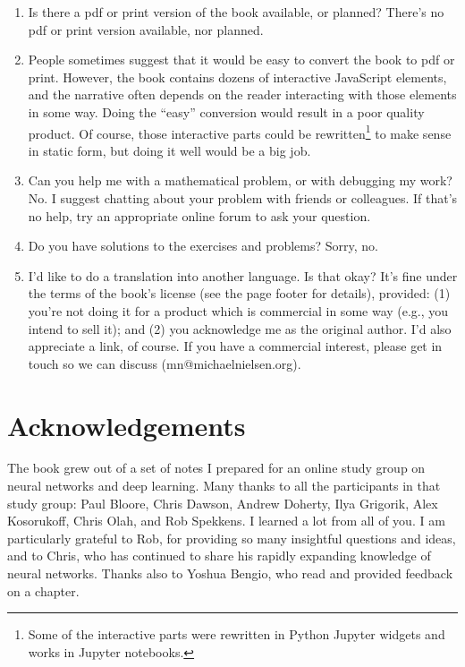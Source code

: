\begin{enumerate}

\item
Is there a pdf or print version of the book available, or planned? There's no pdf or print version available, nor planned.

\item
People sometimes suggest that it would be easy to convert the book to pdf or print. However, the book contains dozens of interactive JavaScript elements, and the narrative often depends on the reader interacting with those elements in some way. Doing the ``easy'' conversion would result in a poor quality product. Of course, those interactive parts could be rewritten\footnote{Some of the interactive parts were rewritten in Python Jupyter widgets and works in Jupyter notebooks\cite{willersNNDLgithub2019}.} to make sense in static form, but doing it well would be a big job.

\item
Can you help me with a mathematical problem, or with debugging my work? No. I suggest chatting about your problem with friends or colleagues. If that's no help, try an appropriate online forum to ask your question.

\item
Do you have solutions to the exercises and problems? Sorry, no.

\item
I'd like to do a translation into another language. Is that okay? It's fine under the terms of the book's license (see the page footer for details), provided: (1) you're not doing it for a product which is commercial in some way (e.g., you intend to sell it); and (2) you acknowledge me as the original author. I'd also appreciate a link, of course. If you have a commercial interest, please get in touch so we can discuss (mn@michaelnielsen.org).
\end{enumerate}

\section*{Acknowledgements}

The book grew out of a set of notes I prepared for an online study group on neural networks and deep learning. Many thanks to all the participants in that study group: Paul Bloore, Chris Dawson, Andrew Doherty, Ilya Grigorik, Alex Kosorukoff, Chris Olah, and Rob Spekkens. I learned a lot from all of you. I am particularly grateful to Rob, for providing so many insightful questions and ideas, and to Chris, who has continued to share his rapidly expanding knowledge of neural networks. Thanks also to Yoshua Bengio, who read and provided feedback on a chapter.

